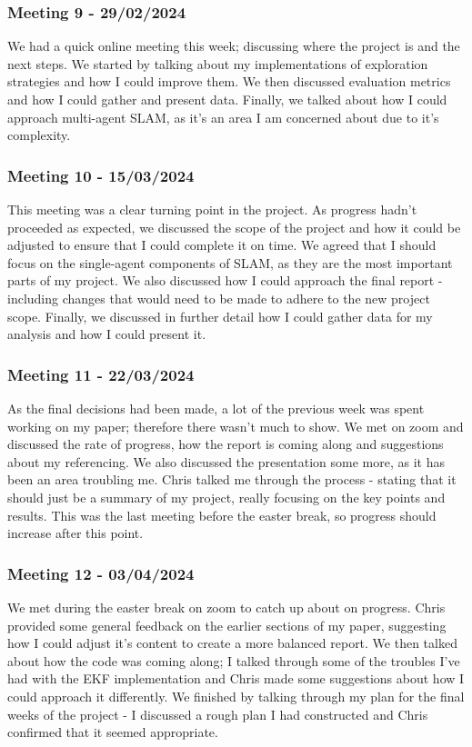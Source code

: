 \documentclass[12pt]{article}
\begin{document}
\subsubsection{Meeting 9 - 29/02/2024}
We had a quick online meeting this week; discussing where the project is and the next steps. We started by talking about
my implementations of exploration strategies and how I could improve them. We then discussed evaluation metrics and how I
could gather and present data. Finally, we talked about how I could approach multi-agent SLAM, as it's an area I am concerned
about due to it's complexity.
\subsubsection{Meeting 10 - 15/03/2024}
This meeting was a clear turning point in the project. As progress hadn't proceeded as expected, we discussed the scope of
the project and how it could be adjusted to ensure that I could complete it on time. We agreed that I should focus on the single-agent
components of SLAM, as they are the most important parts of my project. We also discussed how I could approach the final report -
including changes that would need to be made to adhere to the new project scope. Finally, we discussed in further detail how I could
gather data for my analysis and how I could present it.
\subsubsection{Meeting 11 - 22/03/2024}
As the final decisions had been made, a lot of the previous week was spent working on my paper; therefore there wasn't much to show.
We met on zoom and discussed the rate of progress, how the report is coming along and suggestions about my referencing. We also
discussed the presentation some more, as it has been an area troubling me. Chris talked me through the process - stating that it should
just be a summary of my project, really focusing on the key points and results. This was the last meeting before the easter break, so
progress should increase after this point.
\subsubsection{Meeting 12 - 03/04/2024}
We met during the easter break on zoom to catch up about on progress. Chris provided some general feedback on the earlier sections
of my paper, suggesting how I could adjust it's content to create a more balanced report. We then talked about how the code was
coming along; I talked through some of the troubles I've had with the EKF implementation and Chris made some suggestions about
how I could approach it differently. We finished by talking through my plan for the final weeks of the project - I discussed a rough
plan I had constructed and Chris confirmed that it seemed appropriate.
\end{document}
